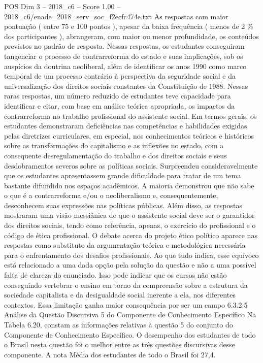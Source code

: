 \begin{textsample}{POS Dim 3 – 2018\_c6 – Score 1.00 – 2018\_c6/enade\_2018\_serv\_soc\_f2ecfc474e.txt}
As respostas com maior pontuação ( entre 75 e 100 pontos ), apesar da baixa frequência ( menos de 2 \% dos participantes ), abrangeram, com maior ou menor profundidade, os conteúdos previstos no padrão de resposta.
Nessas respostas, os estudantes conseguiram tangenciar o processo de contrarreforma do estado e suas implicações, sob os auspícios da doutrina neoliberal, além de identificar os anos 1990 como marco temporal de um processo contrário à perspectiva da seguridade social e da universalização dos direitos sociais constantes da Constituição de 1988.
Nessas raras respostas, um número reduzido de estudantes teve capacidade para identificar e citar, com base em análise teórica apropriada, os impactos da contrarreforma no trabalho profissional do assistente social.
Em termos gerais, os estudantes demonstraram deficiências nas competências e habilidades exigidas pelas diretrizes curriculares, em especial, nos conhecimentos teóricos e históricos sobre as transformações do capitalismo e as inflexões no estado, com a consequente desregulamentação do trabalho e dos direitos sociais e seus desdobramentos severos sobre as políticas sociais.
Surpreendeu consideravelmente que os estudantes apresentassem grande dificuldade para tratar de um tema bastante difundido nos espaços acadêmicos.
A maioria demonstrou que não sabe o que é a contrarreforma e/ou o neoliberalismo e, consequentemente, desconhecem suas expressões nas políticas públicas.
Além disso, as respostas mostraram uma visão messiânica de que o assistente social deve ser o garantidor dos direitos sociais, tendo como referência, apenas, o exercício do profissional e o código de ética profissional.
O debate acerca do projeto ético político aparece nas respostas como substituto da argumentação teórica e metodológica necessária para o enfrentamento dos desafios profissionais.
Ao que tudo indica, esse equívoco está relacionado a uma dada opção pela solução da questão e não a uma possível falta de clareza do enunciado.
Isso pode indicar que os cursos não estão conseguindo vertebrar o ensino em torno da compreensão sobre a estrutura da sociedade capitalista e da desigualdade social inerente a ela, nos diferentes contextos.
Essa limitação ganha maior consequência por ser um campo 6.3.2.5 Análise da Questão Discursiva 5 do Componente de Conhecimento Específico Na Tabela 6.20, constam as informações relativas à questão 5 do conjunto do Componente de Conhecimento Específico.
O desempenho dos estudantes de todo o Brasil nesta questão foi o melhor entre as três questões discursivas desse componente.
A nota Média dos estudantes de todo o Brasil foi 27,4.

\end{textsample}
